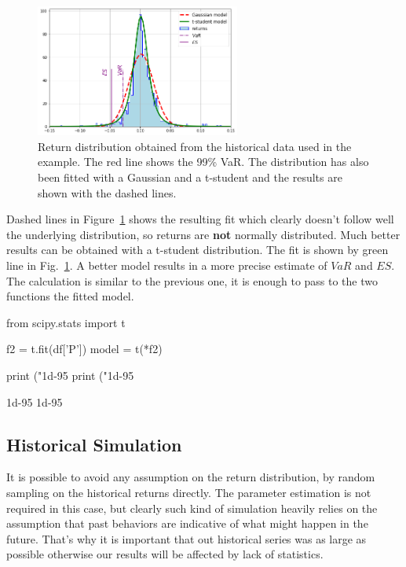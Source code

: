 \begin{figure}[htb]
\centering
\includegraphics[width=0.6\textwidth]{figures/parametric_var}
\caption{Return distribution obtained from the historical data used in the example. The red line shows the 99\% VaR. The distribution has also been fitted with a Gaussian and a t-student and the results are shown with the dashed lines.}
\label{fig:paramtric_var}
\end{figure}

Dashed lines in Figure~\ref{fig:paramtric_var} shows the resulting fit which clearly doesn't follow well the underlying distribution, so returns are \textbf{not} normally distributed. Much better results can be obtained with a t-student distribution. The fit is shown by green line in Fig.~\ref{fig:paramtric_var}. A better model results in a more precise estimate of $VaR$ and $ES$. The calculation is similar to the previous one, it is enough to pass to the two functions the fitted model.

\begin{ipython}
from scipy.stats import t

f2 = t.fit(df['P'])
model = t(*f2)

print ("1d-95%
print ("1d-95%
\end{ipython}
\begin{ioutput}
1d-95%
1d-95%
\end{ioutput}

\subsection{Historical Simulation}
\label{historical-simulation}

It is possible to avoid any assumption on the return distribution, by random sampling on the historical returns directly. The parameter estimation is not required in this case, but clearly such kind of simulation heavily relies on the assumption that past behaviors are indicative of what might happen in the future. That's why it is important that out historical series was as large as possible otherwise our results will be affected by lack of statistics. 

